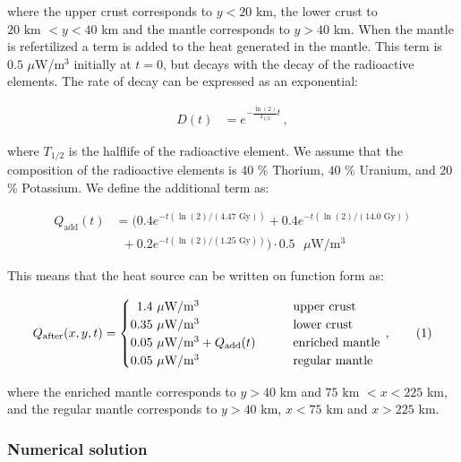 \documentclass[reprint,english,notitlepage]{revtex4-1}  %
\newcommand\numberthis{\addtocounter{equation}{1}\tag{\theequation}}
\begin{document}
where the upper crust corresponds to $y<20$ km, the lower crust to $20 \text{ km } < y < 40$ km and the mantle corresponds to $y > 40$ km. When the mantle is refertilized a term is added to the heat generated in the mantle. This term is $0.5$ $\mu$W/m$^3$ initially at $t=0$, but decays with the decay of the radioactive elements. The rate of decay can be expressed as an exponential:

\begin{align*}
D(t) &= e^{-\frac{\ln(2)}{T_{1/2}} t} \, ,
\end{align*}

where $T_{1/2}$ is the halflife of the radioactive element. We assume that the composition of the radioactive elements is $40$ \% Thorium, $40$ \% Uranium, and $20$ \% Potassium. We define the additional term as:

\begin{align*}
Q_\text{add}(t) &= (0.4e^{-t(\ln(2)/(4.47  \text{ Gy}))   } + 0.4e^{-t(\ln(2)/(14.0  \text{ Gy}))   } \\
&\,\,\,+ 0.2e^{-t(\ln(2)/(1.25  \text{ Gy}))   }) \cdot 0.5 \text{ $\mu$W/m$^3$} 
\end{align*}

This means that the heat source can be written on function form as:

\begin{align*}
Q_\text{after}(x,y,t) = \begin{cases}
\,\,\, 1.4 \text{ $\mu$W/m$^3$} \quad \quad  &\text{upper crust} \\
0.35 \text{ $\mu$W/m$^3$} \quad \quad &\text{lower crust} \\
0.05 \text{ $\mu$W/m$^3$} + Q_\text{add}(t) \quad \quad &\text{enriched mantle} \\
0.05 \text{ $\mu$W/m$^3$} \quad \quad & \text{regular mantle}
\end{cases} \, , \numberthis \label{eq:refertilized_heat}
\end{align*}

where the enriched mantle corresponds to $y>40$ km and $75 \text{ km } < x < 225$ km, and the regular mantle corresponds to $y> 40$ km, $x<75$ km and $x>225$ km.
 



\subsubsection{Numerical solution} \label{sec:formalism_heat_eq_with_source_numerical_sol}
\end{document}
